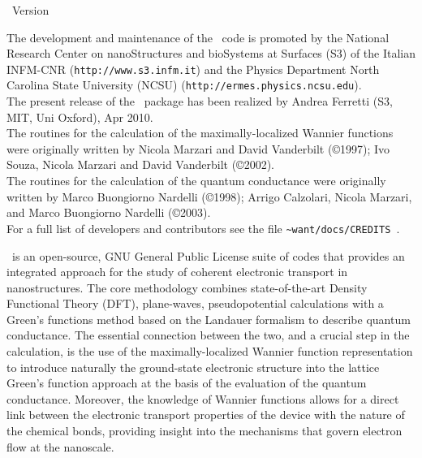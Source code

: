 
\thispagestyle{empty}
\begin{centering}
{\LARGE \WANT\ Version \WANTVERSION}\\
\end{centering}
\vspace{0.35in}

 The development and  maintenance of the
\WANT\ code is promoted by the National Research Center on
nanoStructures and bioSystems at Surfaces (S3) of the Italian
INFM-CNR (\texttt{http://www.s3.infm.it}) and the Physics Department North
Carolina State University (NCSU) (\texttt{http://ermes.physics.ncsu.edu}). \\

\noindent The present release of the \WANT\ package has been
realized by 
Andrea Ferretti (S3, MIT, Uni Oxford), Apr 2010. \\

\noindent The routines for the calculation of the
maximally-localized Wannier functions were originally written by
Nicola Marzari and David Vanderbilt (\copyright 1997);  Ivo Souza,
Nicola Marzari and David Vanderbilt (\copyright 2002). \\ 

\noindent The routines for the calculation of the quantum
conductance were originally written by Marco Buongiorno Nardelli
(\copyright 1998); Arrigo Calzolari, Nicola Marzari, and
Marco Buongiorno Nardelli (\copyright 2003).\\

\noindent For a full list of developers and contributors see the file
\texttt{\~{}want/docs/CREDITS }. \\
 \vspace{0.25in}

 \WANT\ is an open-source, GNU
General Public License suite of codes that provides an integrated
approach for the study of coherent electronic transport in
nanostructures. The core methodology combines state-of-the-art
Density Functional Theory (DFT), plane-waves, pseudopotential
calculations with a Green's functions method based on the Landauer
formalism to describe quantum conductance. The essential
connection between the two, and a crucial step in the calculation,
is the use of the maximally-localized Wannier function
representation to introduce naturally the ground-state electronic
structure into the lattice Green's function approach at the basis
of the evaluation of the quantum conductance. Moreover, the
knowledge of Wannier functions allows for a
direct link between the electronic transport properties of the
device with the nature of the chemical bonds, providing insight
into the mechanisms that govern electron flow at the nanoscale.\\

